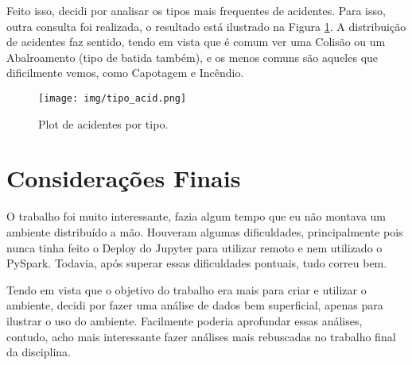 \documentclass{article}
\begin{document}
Feito isso, decidi por analisar os tipos mais frequentes de acidentes. Para isso, outra consulta foi realizada, o resultado está ilustrado na Figura \ref{fig:df_acid_type}. A distribuição de acidentes faz sentido, tendo em vista que é comum ver uma Colisão ou um Abalroamento (tipo de batida também), e os menos comuns são aqueles que dificilmente vemos, como Capotagem e Incêndio.

\begin{figure}[H]
  \centering
  \texttt{[image: img/tipo\_acid.png]}
  \caption{Plot de acidentes por tipo.}
  \label{fig:df_acid_type}
\end{figure}

\section{Considerações Finais}

O trabalho foi muito interessante, fazia algum tempo que eu não montava um ambiente distribuído a mão. Houveram algumas dificuldades, principalmente pois nunca tinha feito o Deploy do Jupyter para utilizar remoto e nem utilizado o PySpark. Todavia, após superar essas dificuldades pontuais, tudo correu bem.

Tendo em vista que o objetivo do trabalho era mais para criar e utilizar o ambiente, decidi por fazer uma análise de dados bem superficial, apenas para ilustrar o uso do ambiente. Facilmente poderia aprofundar essas análises, contudo, acho mais interessante fazer análises mais rebuscadas no trabalho final da disciplina.
\end{document}
